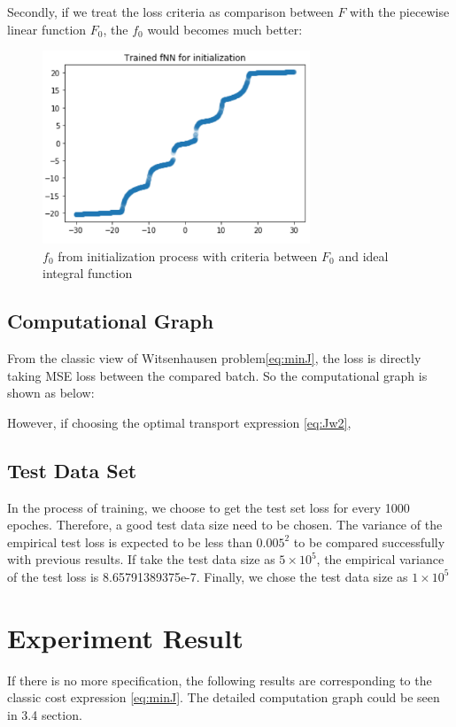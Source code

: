 \documentclass[conference,compsoc]{IEEEtran}
\begin{document}
Secondly, if we treat the loss criteria as comparison between $F$ with the piecewise linear function $F_0$, the $f_0$ would becomes much better:
\begin{figure}[htp]
  \centering
  \includegraphics[width=8cm]{images/ICNN_f_init.png}
  \caption{$f_0$ from initialization process with criteria between $F_0$ and ideal integral function}
  \label{fig:train result}
\end{figure}

\subsection{Computational Graph}
From the classic view of Witsenhausen problem\eqref{eq:minJ}, the loss is directly taking MSE loss between the compared batch. So the computational graph is shown as below:


However, if choosing the optimal transport expression \eqref{eq:Jw2}, 

\subsection{Test Data Set}
In the process of training, we choose to get the test set loss for every 1000 epoches. Therefore, a good test data size need to be chosen. The variance of the empirical test loss is expected to be less than $0.005^2$ to be compared successfully with previous results. If take the test data size as $5\times10^5$, the empirical variance of the test loss is 8.65791389375e-7. Finally, we chose the test data size as $1\times10^5$

\section{Experiment Result}
If there is no more specification, the following results are corresponding to the classic cost expression \eqref{eq:minJ}. The detailed computation graph could be seen in 3.4 section.
\end{document}
